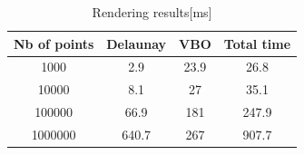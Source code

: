 \begin{table}[ht]
\caption{Rendering results[ms]} %
\centering %
\begin{tabular}{c |c c| c } %
\hline\hline %
 Nb of points & Delaunay & VBO & Total time\\ [0.5ex] %
\hline %

1000 & 2.9 & 23.9 & 26.8 \\
10000 & 8.1	&	27 	& 35.1\\
100000 & 66.9 & 181 & 247.9 \\
1000000 & 640.7	& 267 & 907.7\\[1ex]


\hline %
\end{tabular}
\label{table:nonlin} %
\end{table}


